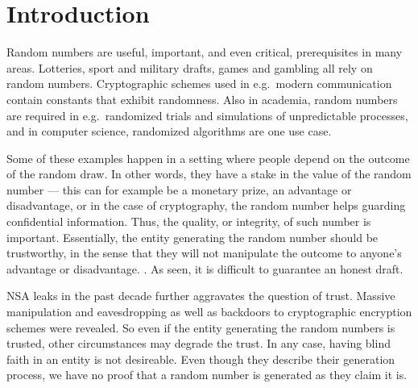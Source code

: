 \section{Introduction}\label{cha:introduction}

Random numbers are useful, important, and even critical, prerequisites in many areas. Lotteries, sport and military drafts, games and gambling all rely on random numbers. Cryptographic schemes used in e.g.\ modern communication contain constants that exhibit randomness. Also in academia, random numbers are required in e.g.\ randomized trials and simulations of unpredictable processes, and in computer science, randomized algorithms are one use case.

Some of these examples happen in a setting where people depend on the outcome of the random draw. In other words, they have a stake in the value of the random number --- this can for example be a monetary prize, an advantage or disadvantage, or in the case of cryptography, the random number helps guarding confidential information. Thus, the quality, or integrity, of such number is important. Essentially, the entity generating the random number should be trustworthy, in the sense that they will not manipulate the outcome to anyone's advantage or disadvantage. . As seen, it is difficult to guarantee an honest draft.

NSA leaks in the past decade further aggravates the question of trust. Massive manipulation and eavesdropping as well as backdoors to cryptographic encryption schemes were revealed. So even if the entity generating the random numbers is trusted, other circumstances may degrade the trust. In any case, having blind faith in an entity is not desireable. Even though they describe their generation process, we have no proof that a random number is generated as they claim it is.


